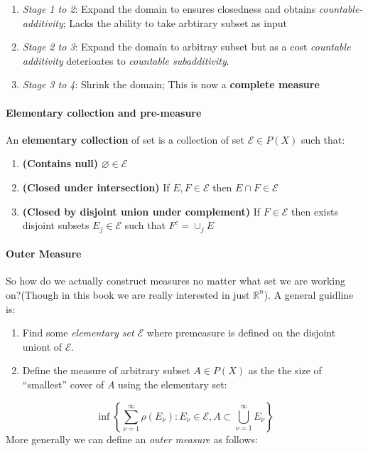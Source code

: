 \begin{enumerate}
\item \textit{Stage 1 to 2}: Expand the domain to ensures closedness and obtains \textit{countable-additivity}; Lacks the ability to take arbtirary subset as input
\item \textit{Stage 2 to 3}: Expand the domain to arbitray subset but as a cost \textit{countable additivity} deterioates to \textit{countable subadditivity}.
\item \textit{Stage 3 to 4}: Shrink the domain; This is now a \textbf{complete measure}
\end{enumerate}

\paragraph{Elementary collection and pre-measure}

\begin{definition}An \textbf{elementary collection} of set is a collection of set $\mathcal E \in P(X)$ such that:

\begin{enumerate}
\item \textbf{(Contains null)} $\varnothing \in \mathcal E$
\item \textbf{(Closed under intersection)} If $E,F\in \mathcal E$ then $E\cap F\in \mathcal E$
\item \textbf{(Closed by disjoint union under complement)} If $F\in \mathcal E$ then exists disjoint subsets $E_j\in \mathcal E$ such that $F^c = \cup_j E$
\end{enumerate}

\end{definition}\paragraph{Outer Measure}

So how do we actually construct measures no matter what set we are working on?(Though in this book we are really interested in just $\mathbb{R}^n$). A general guidline is:

\begin{enumerate}
\item Find some \textit{elementary set} $\mathcal{E}$ where premeasure is defined on the disjoint uniont of $\mathcal{E}$.
\item Define the measure of arbitrary subset $A\in P(X)$ as the the size of ``smallest'' cover of $A$ using the elementary set:
\end{enumerate}
\begin{equation}
\label{omfml}
\inf \left\{\sum_{\nu=1}^{\infty} \rho(E_{\nu}): E_{\nu}\in \mathcal{E}, A\subset \bigcup_{\nu=1}^{\infty} E_{\nu}\right\}
\end{equation}
More generally we can define an \textit{outer measure} as follows:

